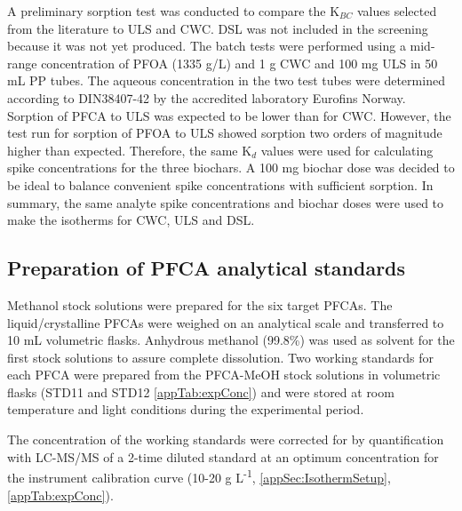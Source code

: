 A preliminary sorption test was conducted to compare the K$_{BC}$ values selected from the literature to ULS and CWC. DSL was not included in the screening because it was not yet produced. The batch tests were performed using a mid-range concentration of PFOA (1335 {\textmu}g/L) and 1 g CWC and 100 mg ULS in 50 mL PP tubes. The aqueous concentration in the two test tubes were determined according to DIN38407-42 by the accredited laboratory Eurofins Norway. Sorption of PFCA to ULS was expected to be lower than for CWC. However, the test run for sorption of PFOA to ULS showed sorption two orders of magnitude higher than expected. Therefore, the same K$_d$ values were used for calculating spike concentrations for the three biochars. A 100 mg biochar dose was decided to be ideal to balance convenient spike concentrations with sufficient sorption. In summary, the same analyte spike concentrations and biochar doses were used to make the isotherms for CWC, ULS and DSL.

\subsection{Preparation of PFCA analytical standards}\label{ssec:PFCAanalytic}
Methanol stock solutions were prepared for the six target PFCAs. The liquid/crystalline PFCAs were weighed on an analytical scale and transferred to 10 mL volumetric flasks. Anhydrous methanol (99.8\%) was used as solvent for the first stock solutions to assure complete dissolution. Two working standards for each PFCA were prepared from the PFCA-MeOH stock solutions in volumetric flasks (STD11 and STD12 \cref{appTab:expConc}) and were stored at room temperature and light conditions during the experimental period. 

The concentration of the working standards were corrected for by quantification with LC-MS/MS of a 2-time diluted standard at an optimum concentration for the instrument calibration curve (10-20 \textmu g L\textsuperscript{-1}, \cref{appSec:IsothermSetup}, \cref{appTab:expConc}).

